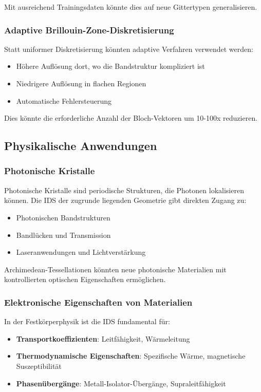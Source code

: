 \documentclass[a4paper,12pt]{article}
\theoremstyle{definition}
\begin{document}
Mit ausreichend Trainingsdaten könnte dies auf neue Gittertypen generalisieren.

\subsubsection{Adaptive Brillouin-Zone-Diskretisierung}

Statt uniformer Diskretisierung könnten adaptive Verfahren verwendet werden:
\begin{itemize}
	\item Höhere Auflösung dort, wo die Bandstruktur kompliziert ist
	\item Niedrigere Auflösung in flachen Regionen
	\item Automatische Fehlersteuerung
\end{itemize}

Dies könnte die erforderliche Anzahl der Bloch-Vektoren um 10-100x reduzieren.

\subsection{Physikalische Anwendungen}

\subsubsection{Photonische Kristalle}

Photonische Kristalle sind periodische Strukturen, die Photonen lokalisieren können. Die IDS der zugrunde liegenden Geometrie gibt direkten Zugang zu:
\begin{itemize}
	\item Photonischen Bandstrukturen
	\item Bandlücken und Transmission
	\item Laseranwendungen und Lichtverstärkung
\end{itemize}

Archimedean-Tessellationen könnten neue photonische Materialien mit kontrollierten optischen Eigenschaften ermöglichen.

\subsubsection{Elektronische Eigenschaften von Materialien}

In der Festkörperphysik ist die IDS fundamental für:
\begin{itemize}
	\item \textbf{Transportkoeffizienten}: Leitfähigkeit, Wärmeleitung
	\item \textbf{Thermodynamische Eigenschaften}: Spezifische Wärme, magnetische Suszeptibilität
	\item \textbf{Phasenübergänge}: Metall-Isolator-Übergänge, Supraleitfähigkeit
\end{itemize}
\end{document}
